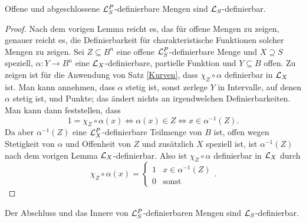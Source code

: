 \begin{theorem}
	Offene und abgeschlossene $\mathcal{L}^P_S$-definierbare Mengen sind $\mathcal{L}_S$-definierbar.
\end{theorem}
\begin{proof}
	Nach dem vorigen Lemma reicht es, das für offene Mengen zu zeigen, genauer reicht es, die Definierbarkeit für charakteristische Funktionen solcher Mengen zu zeigen. Sei $Z\subseteq B^n$ eine offene $\mathcal{L}^P_S$-definierbare Menge und $X\supseteq S$ speziell, $\alpha:Y\rightarrow B^n$ eine $\mathcal{L}_X$-definierbare, partielle Funktion und $Y\subseteq B$ offen. Zu zeigen ist für die Anwendung von Satz \ref{Kurven}, dass $\chi_Z\circ\alpha$ definierbar in $\mathcal{L}_X$ ist. Man kann annehmen, dass $\alpha$ stetig ist, sonst zerlege $Y$ in Intervalle, auf denen $\alpha$ stetig ist, und Punkte; das ändert nichts an irgendwelchen Definierbarkeiten. Man kann dann feststellen, dass $$1=\chi_Z\circ\alpha(x)\Leftrightarrow\alpha(x)\in Z\Leftrightarrow x\in\alpha^{-1}(Z).$$ Da aber $\alpha^{-1}(Z)$ eine $\mathcal{L}^P_X$-definierbare Teilmenge von $B$ ist, offen wegen Stetigkeit von $\alpha$ und Offenheit von $Z$ und zusätzlich $X$ speziell ist, ist $\alpha^{-1}(Z)$ nach dem vorigen Lemma $\mathcal{L}_X$-definierbar. Also ist $\chi_Z\circ\alpha$ definierbar in $\mathcal{L}_X$ durch $$\chi_Z\circ\alpha(x)=\left\{\begin{array}{ll}
	1&x\in\alpha^{-1}(Z)\\
	0&\text{sonst}
	\end{array}\right..$$
\end{proof}

\begin{corollary}
	Der Abschluss und das Innere von $\mathcal{L}^P_S$-definierbaren Mengen sind $\mathcal{L}_S$-definierbar.
\end{corollary}